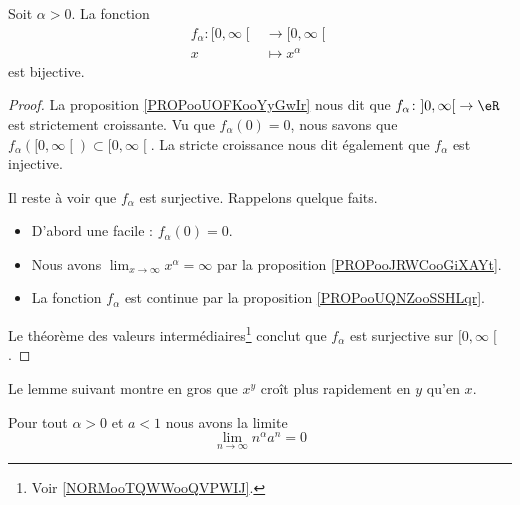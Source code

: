 \begin{proposition}     \label{PROPooEXGKooCqzLor}
	Soit \( \alpha>0\). La fonction
	\begin{equation}
		\begin{aligned}
			f_{\alpha}\colon \mathopen[ 0 , \infty \mathclose[ & \to \mathopen[ 0 , \infty \mathclose[ \\
			x                                                  & \mapsto x^{\alpha}
		\end{aligned}
	\end{equation}
	est bijective.
\end{proposition}

\begin{proof}
	La proposition \ref{PROPooUOFKooYyGwIr} nous dit que \( f_{\alpha}\colon \mathopen] 0 , \infty \mathclose[\to \eR\) est strictement croissante. Vu que  \( f_{\alpha}(0)=0\), nous savons que \( f_{\alpha}(\mathopen[ 0 , \infty \mathclose[)\subset\mathopen[ 0 , \infty \mathclose[\). La stricte croissance nous dit également que \( f_{\alpha}\) est injective.

	Il reste à voir que \( f_{\alpha}\) est surjective. Rappelons quelque faits.
	\begin{itemize}
		\item D'abord une facile :     \( f_{\alpha}(0)=0\).
		\item
		      Nous avons \( \lim_{x\to \infty} x^{\alpha}=\infty\) par la proposition \ref{PROPooJRWCooGiXAYt}.
		\item
		      La fonction \( f_{\alpha}\) est continue par la proposition \ref{PROPooUQNZooSSHLqr}.
	\end{itemize}
	Le théorème des valeurs intermédiaires\footnote{Voir \ref{NORMooTQWWooQVPWIJ}.} conclut que \( f_{\alpha}\) est surjective sur \( \mathopen[ 0 , \infty \mathclose[\).
\end{proof}

Le lemme suivant montre en gros que \( x^y\) croît plus rapidement en \( y\) qu'en \( x\).
\begin{lemma}       \label{LemLJOSooEiNtTs}
	Pour tout \( \alpha>0\) et \( a<1\) nous avons la limite
	\begin{equation}
		\lim_{n\to \infty} n^{\alpha}a^n=0
	\end{equation}
\end{lemma}

